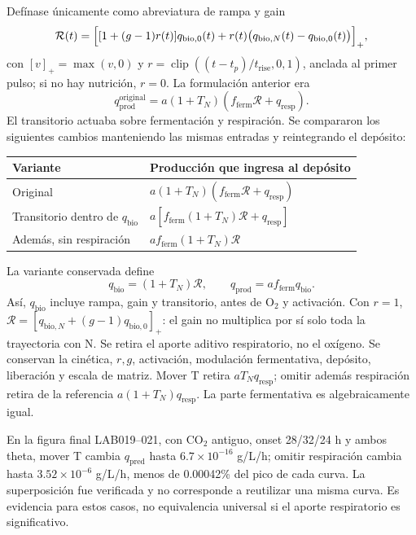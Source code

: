 \documentclass[10pt,a4paper]{article}
\newcommand{\qb}{q_{\mathrm{bio}}}
\newcommand{\qp}{q_{\mathrm{prod}}}
\newcommand{\qr}{q_{\mathrm{resp}}}
\newcommand{\qhat}{q_{\mathrm{pred}}}
\newcommand{\ff}{f_{\mathrm{ferm}}}
\newcommand{\clip}{\operatorname{clip}}
\begin{document}
Defínase únicamente como abreviatura de rampa y gain
\begin{equation}
\mathcal R(t)=\Bigl[[1+(g-1)r(t)]q_{\mathrm{bio},0}(t)
+r(t)\bigl(q_{\mathrm{bio},N}(t)-q_{\mathrm{bio},0}(t)\bigr)\Bigr]_+,
\label{eq:R}
\end{equation}
con $[v]_+=\max(v,0)$ y
$r=\clip((t-t_p)/t_{\mathrm{rise}},0,1)$, anclada al primer pulso;
si no hay nutrición, $r=0$. La formulación anterior era
\begin{equation}
\qp^{\mathrm{original}}=a(1+T_N)(\ff\mathcal R+\qr).
\label{eq:original}
\end{equation}
El transitorio actuaba sobre fermentación y respiración. Se compararon los
siguientes cambios manteniendo las mismas entradas y reintegrando el depósito:
\begin{center}\small
\begin{tabular}{@{}lp{10.0cm}@{}}
\toprule Variante & Producción que ingresa al depósito\\\midrule
Original & $a(1+T_N)(\ff\mathcal R+\qr)$\\
Transitorio dentro de $\qb$ & $a[\ff(1+T_N)\mathcal R+\qr]$\\
Además, sin respiración & $a\ff(1+T_N)\mathcal R$\\
\bottomrule
\end{tabular}
\end{center}
La variante conservada define
\begin{equation}
\boxed{\qb=(1+T_N)\mathcal R,\qquad \qp=a\ff\qb.}
\label{eq:final}
\end{equation}
Así, $\qb$ incluye rampa, gain y transitorio, antes de O\(_2\) y activación.
Con $r=1$, $\mathcal R=[q_{\mathrm{bio},N}+(g-1)q_{\mathrm{bio},0}]_+$:
el gain no multiplica por sí solo toda la trayectoria con N.
Se retira el aporte aditivo respiratorio, no el oxígeno. Se conservan la
cinética, $r,g$, activación, modulación fermentativa, depósito, liberación y
escala de matriz. Mover T retira $aT_N\qr$; omitir además respiración retira
de la referencia $a(1+T_N)\qr$. La parte fermentativa es algebraicamente igual.

En la figura final LAB019--021, con CO\(_2\) antiguo, onset 28/32/24 h y
ambos theta, mover T cambia $\qhat$ hasta $6.7\times10^{-16}$ g/L/h;
omitir respiración cambia hasta $3.52\times10^{-6}$ g/L/h, menos de
0.00042\% del pico de cada curva. La superposición fue verificada y no
corresponde a reutilizar una misma curva. Es evidencia para estos casos,
no equivalencia universal si el aporte respiratorio es significativo.
\end{document}
